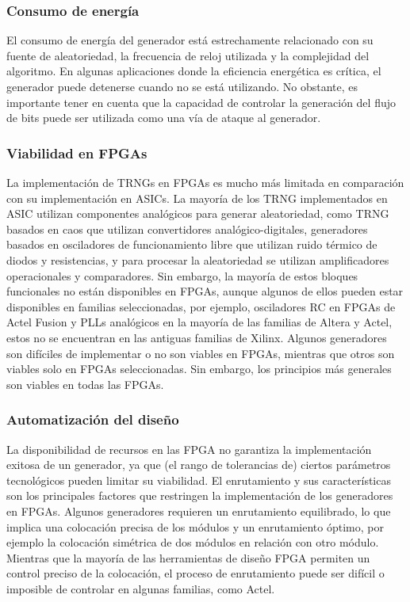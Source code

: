             \subsubsection{Consumo de energía}
                
            El consumo de energía del generador está estrechamente relacionado con su fuente de aleatoriedad, la frecuencia de reloj utilizada y la complejidad del algoritmo. En algunas aplicaciones donde la eficiencia energética es crítica, el generador puede detenerse cuando no se está utilizando. No obstante, es importante tener en cuenta que la capacidad de controlar la generación del flujo de bits puede ser utilizada como una vía de ataque al generador.
                
            \subsubsection{Viabilidad en FPGAs}

            La implementación de TRNGs en FPGAs es mucho más limitada en comparación con su implementación en ASICs. La mayoría de los TRNG implementados en ASIC utilizan componentes analógicos para generar aleatoriedad, como TRNG basados en caos que utilizan convertidores analógico-digitales, generadores basados en osciladores de funcionamiento libre que utilizan ruido térmico de diodos y resistencias, y para procesar la aleatoriedad se utilizan amplificadores operacionales y comparadores. Sin embargo, la mayoría de estos bloques funcionales no están disponibles en FPGAs, aunque algunos de ellos pueden estar disponibles en familias seleccionadas, por ejemplo, osciladores RC en FPGAs de Actel Fusion y PLLs analógicos en la mayoría de las familias de Altera y Actel, estos no se encuentran en las antiguas familias de Xilinx. Algunos generadores son difíciles de implementar o no son viables en FPGAs, mientras que otros son viables solo en FPGAs seleccionadas. Sin embargo, los principios más generales son viables en todas las FPGAs.
            
            \subsubsection{Automatización del diseño}
            
            La disponibilidad de recursos en las FPGA no garantiza la implementación exitosa de un generador, ya que (el rango de tolerancias de) ciertos parámetros tecnológicos pueden limitar su viabilidad. El enrutamiento y sus características son los principales factores que restringen la implementación de los generadores en FPGAs. Algunos generadores requieren un enrutamiento equilibrado, lo que implica una colocación precisa de los módulos y un enrutamiento óptimo, por ejemplo la colocación simétrica de dos módulos en relación con otro módulo. Mientras que la mayoría de las herramientas de diseño FPGA permiten un control preciso de la colocación, el proceso de enrutamiento puede ser difícil o imposible de controlar en algunas familias, como Actel. 

